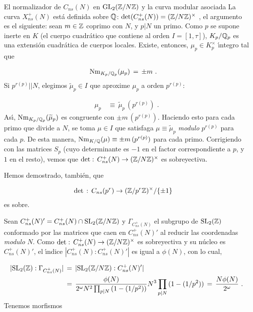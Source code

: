 \begin{subsection}{El normalizador de $C_{ns}(N)$ en $\mathrm{GL}_{2}(\mathbb{Z}/N\mathbb{Z})$ %
		y la curva modular asociada}
La curva $X_{ns}^{+}(N)$ est\'{a} definida sobre $\mathbb{Q}$:
$\mathrm{det}(C_{ns}^{+}(N))=(\mathbb{Z}/N\mathbb{Z})^{\times}$ \cite{booher}, el argumento es el
siguiente: sean $m\in\mathbb{Z}$ coprimo con $N$, y $p|N$ un primo. Como $p$ se
supone inerte en $K$ (el cuerpo cuadr\'{a}tico que contiene al orden
$I=[1,\tau]$), $K_{p}/\mathbb{Q}_{p}$ es una extensi\'{o}n cuadr\'{a}tica de cuerpos
locales. Existe, entonces, $\mu_{p}\in K_{p}^{\times}$ \'{\i}ntegro tal que

\begin{align*}
 \mathrm{Nm}_{K_{p}/\mathbb{Q}_{p}}(\mu_{p})& \,=\,\pm m\text{ .}
\end{align*}
Si $p^{r(p)}||N$, elegimos $\widetilde{\mu}_{p}\in I$ que aproxime $\mu_{p}$ a
orden $p^{r(p)}$:

\begin{align*}
 \mu_{p} & \,\equiv\,\widetilde{\mu}_{p}\,(p^{r(p)})\text{ .}
\end{align*}
As\'{\i}, $\mathrm{Nm}_{K_{p}/\mathbb{Q}_{p}}(\widetilde{\mu}_{p})$ es congruente con
$\pm m\,(p^{r(p)})$. Haciendo esto para cada primo que divide a $N$, se toma
$\mu\in I$ que satisfaga $\mu\equiv\widetilde{\mu}_{p}$ \textit{modulo} $p^{r(p)}$
para cada $p$. De esta manera, $\mathrm{Nm}_{K/\mathbb{Q}}(\mu)\equiv \pm m\,(p^{r(p)})$ para
cada primo. Corrigiendo con las matrices $S_{p}$ (cuyo determinante es $-1$ en el
factor correspondiente a $p$, y $1$ en el resto), vemos que
$\mathrm{det}:\,C_{ns}^{+}(N)\rightarrow(\mathbb{Z}/N\mathbb{Z})^{\times}$ es sobreyectiva.

\begin{obsDetSobreUnidades}\label{thm:obsDetSobreUnidades}
 Hemos demostrado, tambi\'{e}n, que

 \begin{align*}
  \mathrm{det} & \,:\,C_{ns}(p^{r})\rightarrow(\mathbb{Z}/p^{r}\mathbb{Z})^{\times}/\{\pm 1\}
 \end{align*}
es sobre.

\end{obsDetSobreUnidades}

Sean $C_{ns}^{+}(N)'=C_{ns}^{+}(N)\cap\mathrm{SL}_{2}(\mathbb{Z}/N\mathbb{Z})$ y
$\Gamma_{C_{ns}^{+}(N)}$ el subgrupo de $\mathrm{SL}_{2}(\mathbb{Z})$ conformado por las
matrices que caen en $C_{ns}^{+}(N)'$ al reducir las coordenadas \textit{modulo}
$N$. Como $\mathrm{det}:\,C_{ns}^{+}(N)\rightarrow(\mathbb{Z}/N\mathbb{Z})^{\times}$ es
sobreyectiva y su n\'{u}cleo es $C_{ns}^{+}(N)'$, el \'{\i}ndice
$|C_{ns}^{+}(N):C_{ns}^{+}(N)'|$ es igual a $\phi(N)$, con lo cual, 

\begin{align*}
 |\mathrm{SL}_{2}(\mathbb{Z}):\Gamma_{C_{ns}^{+}(N)}| & \,=\,
 |\mathrm{SL}_{2}(\mathbb{Z}/N\mathbb{Z}):C_{ns}^{+}(N)'| \\
 & \,=\,\frac{\phi(N)}{2^{\omega}N^{2}\prod_{p|N}\,(1-(1/p^{2}))}
 N^{3}\prod_{p|N}\,(1-(1/p^{2})) \,=\,\frac{N\phi(N)}{2^{\omega}}
 \text{ .}
\end{align*}
Tenemos morfismos


\end{subsection}
